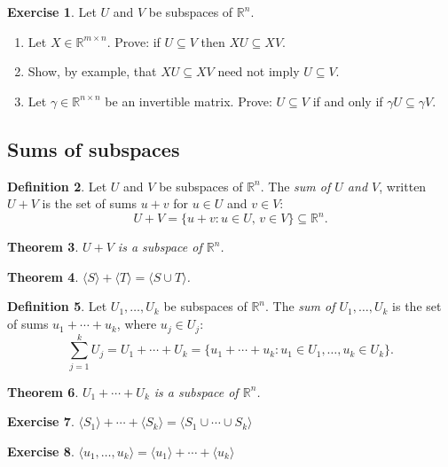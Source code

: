 \documentclass[fullpage]{amsart}
\newcommand{\RR}{\mathbb{R}}
\newtheorem{theorem}{Theorem}[section]
\theoremstyle{definition}
\newtheorem{definition}[theorem]{Definition}
\newtheorem{exercise}[theorem]{Exercise}
\begin{document}
\begin{exercise}\label{exercise:translation_preserves_inclusion}
Let $U$ and $V$ be subspaces of $\RR^n$.
\begin{enumerate}
\item Let $X\in\RR^{m\times n}$. Prove: if $U\subseteq V$ then $X U\subseteq X V$.
\item Show, by example, that $XU\subseteq XV$ need not imply $U\subseteq V$.
\item Let $\gamma\in\RR^{n\times n}$ be an invertible matrix. Prove: $U\subseteq V$ if and only if $\gamma U\subseteq \gamma V$. 
\end{enumerate}
\end{exercise}

\subsection{Sums of subspaces}

\begin{definition}
 Let $U$ and $V$ be subspaces of $\RR^n$.
The \emph{sum of $U$ and $V$}, written $U + V$ is the set of sums $u+v$ for $u\in U$ and $v\in V$:
$$
U + V = \{u + v : u\in U,\,v\in V\}\subseteq\RR^n.
$$
\end{definition}

\begin{theorem}
  $U+ V$ is a subspace of $\RR^n$.
\end{theorem}

\begin{theorem}
  $\langle S\rangle + \langle T\rangle = \langle S\cup T\rangle$.
\end{theorem}

\begin{definition}
  Let $U_1,\ldots,U_k$ be subspaces of $\RR^n$. The \emph{sum of $U_1, \ldots, U_k$} is the set of sums $u_1+\cdots+u_k$, where $u_j\in U_j$:
$$
\sum_{j=1}^k U_j = U_1+\cdots + U_k = \{u_1+\cdots + u_k : u_1\in U_1,\ldots, u_k\in U_k\}.
$$ 
\end{definition}

\begin{theorem}
  $U_1+\cdots + U_k$ is a subspace of $\RR^n$.
\end{theorem}

\begin{exercise}
  $\langle S_1\rangle + \cdots + \langle S_k\rangle = \langle S_1\cup\cdots\cup S_k\rangle$ 
\end{exercise}

\begin{exercise}
  $\langle u_1,\ldots,u_k\rangle = \langle u_1\rangle + \cdots + \langle u_k\rangle$
\end{exercise}
\end{document}
